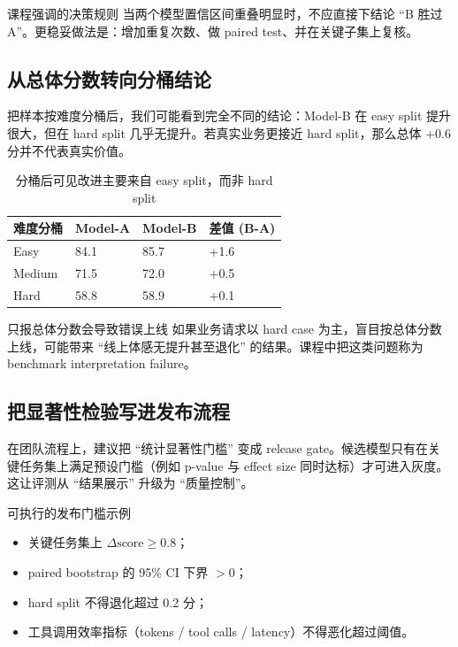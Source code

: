 \documentclass[a4paper]{article}
\begin{document}
\begin{knowledgebox}{课程强调的决策规则}
当两个模型置信区间重叠明显时，不应直接下结论 ``B 胜过 A''。更稳妥做法是：增加重复次数、做 paired test、并在关键子集上复核。
\end{knowledgebox}

\subsection{从总体分数转向分桶结论}
把样本按难度分桶后，我们可能看到完全不同的结论：Model-B 在 easy split 提升很大，但在 hard split 几乎无提升。若真实业务更接近 hard split，那么总体 +0.6 分并不代表真实价值。

\begin{table}[H]
\centering
\begin{tabular}{p{2.3cm}p{2.4cm}p{2.4cm}p{2.4cm}}
\toprule
\textbf{难度分桶} & \textbf{Model-A} & \textbf{Model-B} & \textbf{差值 (B-A)} \\
\midrule
Easy & 84.1 & 85.7 & +1.6 \\
Medium & 71.5 & 72.0 & +0.5 \\
Hard & 58.8 & 58.9 & +0.1 \\
\bottomrule
\end{tabular}
\caption{分桶后可见改进主要来自 easy split，而非 hard split}
\end{table}

\begin{warningbox}{只报总体分数会导致错误上线}
如果业务请求以 hard case 为主，盲目按总体分数上线，可能带来 ``线上体感无提升甚至退化'' 的结果。课程中把这类问题称为 benchmark interpretation failure。
\end{warningbox}

\subsection{把显著性检验写进发布流程}
在团队流程上，建议把 ``统计显著性门槛'' 变成 release gate。候选模型只有在关键任务集上满足预设门槛（例如 p-value 与 effect size 同时达标）才可进入灰度。这让评测从 ``结果展示'' 升级为 ``质量控制''。

\begin{importantbox}{可执行的发布门槛示例}
\begin{itemize}
    \item 关键任务集上 $\Delta \text{score} \ge 0.8$；
    \item paired bootstrap 的 95\% CI 下界 $>0$；
    \item hard split 不得退化超过 0.2 分；
    \item 工具调用效率指标（tokens / tool calls / latency）不得恶化超过阈值。
\end{itemize}
\end{importantbox}
\end{document}
